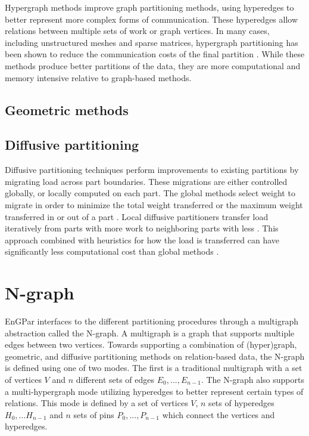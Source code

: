 Hypergraph methods improve graph partitioning methods, using
hyperedges to better represent more complex forms of
communication. These hyperedges allow relations
between multiple sets of work or graph vertices. In
many cases, including unstructured meshes and sparse matrices,
hypergraph partitioning has been shown to reduce the
communication costs of the final partition
\cite{catalyurek1999hypergraph,catalyurek2009repartitioning,devine2006parallel}.
While these methods produce better partitions of the data,
they are more computational and memory intensive relative
to graph-based methods.

\subsection{Geometric methods}

\subsection{Diffusive partitioning}
Diffusive partitioning techniques perform improvements to existing
partitions by migrating load across part boundaries. These migrations
are either controlled globally, or locally computed on each part.
The global methods select weight to migrate in order to minimize
the total weight transferred or the maximum weight transferred
in or out of a part \cite{hu1999improved,ou1994parallel}. Local
diffusive partitioners transfer load iteratively from parts
with more work to neighboring parts with less
\cite{cybenko1989dynamic,subramanian1994analysis}. This approach
combined with heuristics for how the load is transferred can have
significantly less computational cost than global methods
\cite{Fiduccia1982,Kernighan1970}. 

\section{N-graph}
EnGPar interfaces to the different partitioning procedures through a multigraph
abstraction called the N-graph. A multigraph
\cite{BANGJENSENmultigraph, BOESCHmultigraph} is a graph that supports multiple
edges between two vertices. Towards
supporting a combination of (hyper)graph, geometric, and diffusive partitioning
methods on relation-based data, the N-graph is defined using one of two modes.
The first is a traditional multigraph with a set of vertices $V$ and $n$
different sets of edges $E_0,...,E_{n-1}$. The N-graph also supports a
multi-hypergraph mode utilizing hyperedges to better represent certain types
of relations. This mode is defined by a set of vertices $V$, $n$ sets of
hyperedges $H_0,...H_{n-1}$ and $n$ sets of pins $P_0,...,P_{n-1}$ which
connect the vertices and hyperedges.

